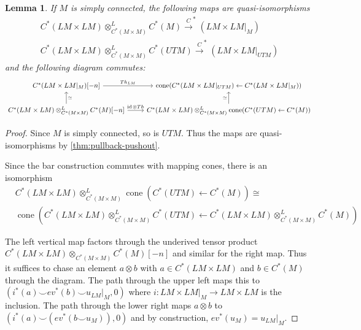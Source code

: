 \documentclass{scrartcl}
\theoremstyle{plain}
\newtheorem{lemma}[theorem]{Lemma}
\theoremstyle{definition}
\newcommand{\cupp}{\mathbin{\smile}}
\DeclareMathOperator{\cone}{cone}
\newcommand{\iso}{\cong}
\newcommand{\quiso}{\simeq}
\newcommand{\from}{\leftarrow}
\let\xto\xrightarrow
\DeclareMathOperator{\id}{id}
\begin{document}
\begin{lemma}\label{lem:thom-map-LM-equal}
    If $M$ is simply connected, the following maps are quasi-isomorphisms
    \begin{align*}
        C^*(LM\times LM)\otimes^L_{C^*(M\times M)} C^*(M) \xto C^*(LM\times LM|_M) \\
        C^*(LM\times LM)\otimes^L_{C^*(M\times M)} C^*(UTM) \xto C^*(LM\times LM|_{UTM}) 
    \end{align*} 
    and the following diagram commutes:
    \begin{equation}\label{diag:lem-thom-map-LM-equal}
    \begin{tikzcd}
        C^*(LM\times LM|_M)[-n] \rar["Th_{LM}"] &  \cone(C^{*}(LM\times LM|_{UTM})\from C^*(LM\times LM|_{M})) \\
        \uar[swap, "\quiso"] C^*(LM\times LM)\otimes^L_{C^*(M\times M)} C^*(M)[-n] \rar["\id\otimes Th"] &  C^*(LM\times LM)\otimes^L_{C^*(M\times M)} \cone(C^*(UTM)\from C^*(M)) \uar["\quiso"]
    \end{tikzcd}
    \end{equation}
\end{lemma}
\begin{proof}
    Since $M$ is simply connected, so is $UTM$. Thus the maps are quasi-isomorphisms by \cref{thm:pullback-pushout}. 

    Since the bar construction commutes with mapping cones, there is an isomorphism
    \begin{align*} 
        &C^*(LM\times LM)\otimes^L_{C^*(M\times M)} \cone(C^*(UTM)\from C^*(M)) \iso \\ &\cone\left(C^*(LM\times LM)\otimes^L_{C^*(M\times M)}C^*(UTM) \from C^*(LM\times LM)\otimes^L_{C^*(M\times M)}C^*(M)\right)
    \end{align*}

    The left vertical map factors through the underived tensor product $C^*(LM\times LM)\otimes_{C^*(M\times M)} C^*(M)[-n]$ and similar for the right map. Thus it suffices to chase an element $a\otimes b$ with $a\in C^*(LM\times LM)$ and $b\in C^*(M)$ through the diagram. The path through the upper left maps this to $(i^*(a)\cupp ev^*(b)\cupp u_{LM}|_M, 0)$ where $i\colon LM\times LM|_M\to LM\times LM$ is the inclusion. The path through the lower right maps $a\otimes b$ to $(i^*(a)\cupp(ev^*(b\cupp u_{M})) ,0)$ and by construction, $ev^*(u_M) = u_{LM}|_M$.
\end{proof}
\end{document}
